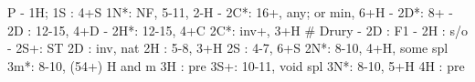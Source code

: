 P - 1H;
1S : 4+S
1N*: NF, 5-11, 2-H
   - 2C*: 16+, any; or min, 6+H
        - 2D*: 8+
   - 2D : 12-15, 4+D
   - 2H*: 12-15, 4+C
2C*: inv+, 3+H  # Drury
   - 2D : F1
   - 2H : s/o
   - 2S+: ST
2D : inv, nat
2H : 5-8, 3+H
2S : 4-7, 6+S
2N*: 8-10, 4+H, some spl
3m*: 8-10, (54+) H and m
3H : pre
3S+: 10-11, void spl
3N*: 8-10, 5+H
4H : pre